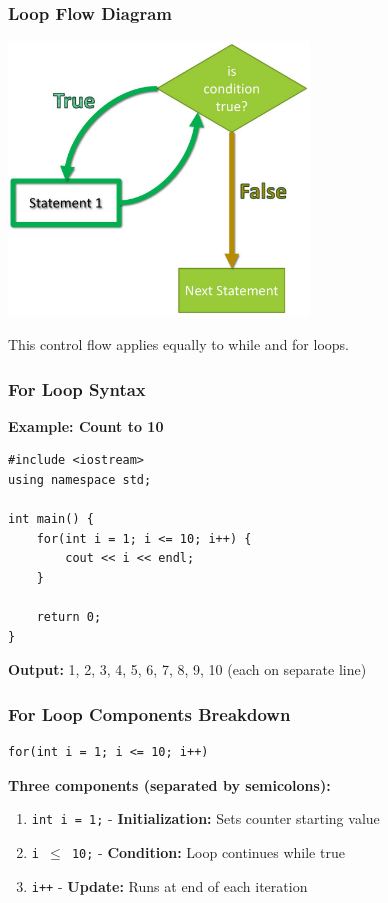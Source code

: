 \documentclass{beamer}
\begin{document}
\begin{frame}
\frametitle{Loop Flow Diagram}
\includegraphics[width=0.6\textwidth]{../images/While-Loop-Flowchart.jpg}

This control flow applies equally to while and for loops.
\end{frame}

\begin{frame}[fragile]
\frametitle{For Loop Syntax}
\textbf{Example: Count to 10}
\begin{verbatim}
#include <iostream>
using namespace std;

int main() {
    for(int i = 1; i <= 10; i++) {
        cout << i << endl;
    }
    
    return 0;
}
\end{verbatim}
\pause

\textbf{Output:} 1, 2, 3, 4, 5, 6, 7, 8, 9, 10 (each on separate line)
\end{frame}

\begin{frame}[fragile]
\frametitle{For Loop Components Breakdown}
\begin{verbatim}
for(int i = 1; i <= 10; i++)
\end{verbatim}
\pause

\textbf{Three components (separated by semicolons):}
\begin{enumerate}
\item \texttt{int i = 1;} - \textbf{Initialization:} Sets counter starting value\pause
\item \texttt{i $\leq$ 10;} - \textbf{Condition:} Loop continues while true\pause
\item \texttt{i++} - \textbf{Update:} Runs at end of each iteration
\end{enumerate}
\end{frame}
\end{document}
